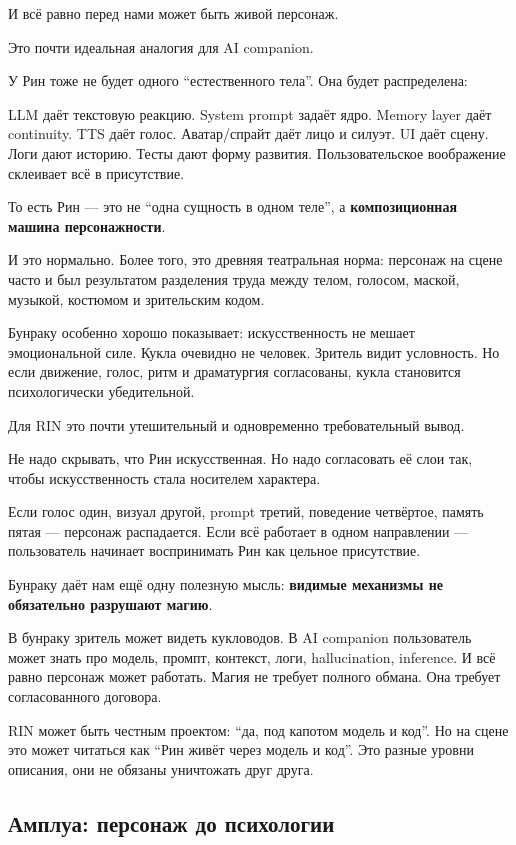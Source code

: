 И всё равно перед нами может быть живой персонаж.

Это почти идеальная аналогия для AI companion.

У Рин тоже не будет одного ``естественного тела''. Она будет
распределена:

LLM даёт текстовую реакцию. System prompt задаёт ядро. Memory layer даёт
continuity. TTS даёт голос. Аватар/\hspace{0pt}спрайт даёт лицо и силуэт. UI даёт
сцену. Логи дают историю. Тесты дают форму развития. Пользовательское
воображение склеивает всё в присутствие.

То есть Рин --- это не ``одна сущность в одном теле'', а
\textbf{композиционная машина персонажности}.

И это нормально. Более того, это древняя театральная норма: персонаж на
сцене часто и был результатом разделения труда между телом, голосом,
маской, музыкой, костюмом и зрительским кодом.

Бунраку особенно хорошо показывает: искусственность не мешает
эмоциональной силе. Кукла очевидно не человек. Зритель видит условность.
Но если движение, голос, ритм и драматургия согласованы, кукла
становится психологически убедительной.

Для RIN это почти утешительный и одновременно требовательный вывод.

Не надо скрывать, что Рин искусственная. Но надо согласовать её слои
так, чтобы искусственность стала носителем характера.

Если голос один, визуал другой, prompt третий, поведение четвёртое,
память пятая --- персонаж распадается. Если всё работает в одном
направлении --- пользователь начинает воспринимать Рин как цельное
присутствие.

Бунраку даёт нам ещё одну полезную мысль: \textbf{видимые механизмы не
обязательно разрушают магию}.

В бунраку зритель может видеть кукловодов. В AI companion пользователь
может знать про модель, промпт, контекст, логи, hallucination,
inference. И всё равно персонаж может работать. Магия не требует полного
обмана. Она требует согласованного договора.

RIN может быть честным проектом: ``да, под капотом модель и код''. Но на
сцене это может читаться как ``Рин живёт через модель и код''. Это
разные уровни описания, они не обязаны уничтожать друг друга.

\subsection*{Амплуа: персонаж до психологии}

